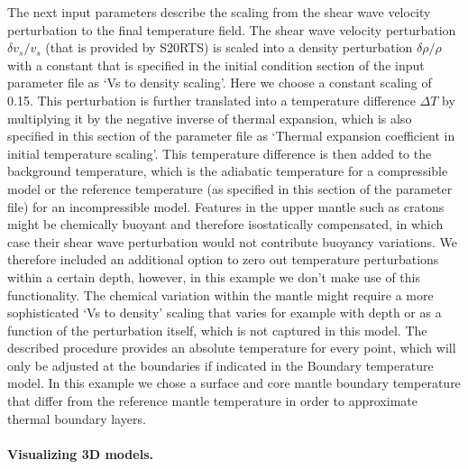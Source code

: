 \documentclass{article}
\begin{document}
The next input parameters describe the scaling from the shear wave velocity 
perturbation to the final temperature field. The shear wave velocity perturbation 
$\delta v_s / v_s$ (that is provided by S20RTS) is scaled into a density perturbation $\delta \rho / \rho$ with a 
constant that is specified in the initial condition section of the input parameter 
file as `Vs to density scaling'. Here we choose a constant scaling of 0.15. This 
perturbation is further translated into a temperature difference $\Delta T$ by 
multiplying it by the negative inverse of thermal expansion, which is also 
specified in this section of the parameter file as `Thermal expansion coefficient 
in initial temperature scaling'. This temperature difference is then added to the 
background temperature, which is the adiabatic temperature for a compressible 
model or the reference temperature (as specified in this section of the parameter file) for an 
incompressible model. Features in the upper mantle such as cratons might 
be chemically buoyant and therefore isostatically compensated, in which case 
their shear wave perturbation would not contribute buoyancy variations. We therefore included an 
additional option to zero out temperature perturbations within a certain depth, however, in this example we don't make use of this functionality. The chemical variation within the mantle 
might require a more sophisticated `Vs to density' scaling that varies for 
example with depth or as a function of the perturbation itself, which is not captured
in this model. The described procedure 
provides an absolute temperature for every point, which will only be adjusted 
at the boundaries if indicated in the Boundary temperature model. In this example
we chose a surface and core mantle boundary temperature that differ from the
reference mantle temperature in order to approximate thermal boundary layers.

\paragraph{Visualizing 3D models.}
\end{document}
